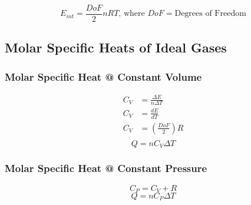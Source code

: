 \documentclass[10pt,letterpaper,final,twoside,notitlepage]{article}
\numberwithin{equation}{section} %
\theoremstyle{definition}
\theoremstyle{remark}
\begin{document}
		\begin{equation} \label{eq:Internal Energy of Ideal Gas}
			E_{int} = \frac{DoF}{2} nRT \text{, where } DoF=\text{Degrees of Freedom}
		\end{equation}
		
	\subsection*{Molar Specific Heats of Ideal Gases} \label{subsec:Molar Specific Heats of Ideal Gases}
		\subsubsection*{Molar Specific Heat @ Constant Volume} \label{subsubsec:Molar Specific Heat at Constant Volume}
			\begin{equation} \label{eq:Molar Specific Heat at Constant Volume}
				\begin{aligned}
					C_{V} &= \frac{\Delta E}{n \Delta T} \\
					C_{V} &= \frac{dE}{dT} \\
					C_{V} &= \left( \frac{DoF}{2} \right) R \\
				\end{aligned}
			\end{equation}
			\begin{equation} \label{eq:Heat with Molar Specific Heat at Constant Volume}
				Q = n C_{V} \Delta T
			\end{equation}
		\subsubsection*{Molar Specific Heat @ Constant Pressure} \label{Molar Specific Heat at Constant Pressure}
			\begin{equation} \label{eq:Molar Specific Heat at Constant Pressure}
				C_{P} = C_{V} + R
			\end{equation}
			\begin{equation} \label{eq:Heat with Molar Specific Heat at Constant Pressure}
			Q = n C_{P} \Delta T
			\end{equation}
	
\end{document}
